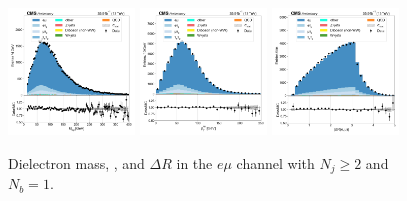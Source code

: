 \begin{figure}[htb!]
    \centering
    \includegraphics[width=0.3\textwidth]{chapters/Appendix/sectionPlots/figures/data_mc_overlays/emu_2016_cat_gt2_gt2_a_signal_linear_lepton_dilepton1_mass}
    \includegraphics[width=0.3\textwidth]{chapters/Appendix/sectionPlots/figures/data_mc_overlays/emu_2016_cat_gt2_gt2_a_signal_linear_lepton_dilepton1_pt}
    \includegraphics[width=0.3\textwidth]{chapters/Appendix/sectionPlots/figures/data_mc_overlays/emu_2016_cat_gt2_gt2_a_signal_linear_lepton_dilepton1_delta_r}
    \caption{Dielectron mass, \pt, and $\Delta R$ in the $e\mu$ channel
    with $N_{j} \geq 2$ and $N_{b} = 1$.}
    \label{fig:emu_6_dilepton}
\end{figure}

